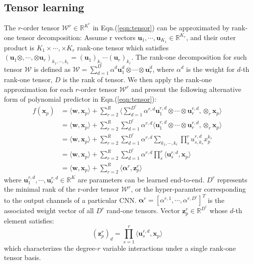 \documentclass[a4paper,4pt]{article}
\begin{document}
\subsection{Tensor learning}
The $r$-order tensor $\bm{\mathcal{W}}^r \in \mathbb{R}^{K^r}$ in Eqn.(\ref{eqn:tensor})
can be approximated by rank-one tensor decomposition: Assume r vectors
$\bm{u}_1,\cdots,\bm{u}_{K_1} \in \mathbb{R}^{K_r}$, and their outer product
is $K_1\times \cdots,\times K_r$ rank-one tensor which satisfies
$(\bm{u}_1 \otimes,\cdots,\otimes \bm{u}_r )_{k_1,\cdots,k_r} 
= (\bm{u}_1)_{k_1}\cdots(\bm{u}_r)_{k_r}$. 
The rank-one decomposition for such tensor $\bm{\mathcal{W}}$ is defined as 
$\bm{\mathcal{W}}=\sum_{d=1}^D \alpha^d \bm{u}_1^d\otimes \cdots \otimes \bm{u}_r^d $,
where $\alpha^d$ is the weight for $d$-th rank-one tensor, $D$ is the rank of tensor.
We then apply the rank-one approximation for each $r$-order tensor $\bm{\mathcal{W}}^r$
and present the following alternative form of polynomial predictor in Eqn.(\ref{eqn:tensor}):
\begin{equation}\label{eqn:confused}
    \begin{aligned}
        f(\bm{x}_p)
        &=\langle \bm{w}, \bm{x}_p \rangle
        +\sum^{R}_{r=2}\langle \sum^{D^r}_{d=1} \alpha^{r,d} 
        \bm{u}_1^{r,d}\otimes \cdots \otimes \bm{u}_r^{r,d}, \otimes_r \bm{x}_p \rangle
        \\
        &=\langle \bm{w}, \bm{x}_p \rangle
        +\sum^{R}_{r=2} \sum^{D^r}_{d=1} \alpha^{r,d} 
        \langle\bm{u}_1^{r,d}\otimes \cdots \otimes \bm{u}_r^{r,d}, \otimes_r \bm{x}_p \rangle
        \\
        &=\langle \bm{w}, \bm{x}_p \rangle
        +\sum^{R}_{r=2} \sum^{D^r}_{d=1} \alpha^{r,d} 
        \sum_{k_1,\cdots,k_r}\prod_s^r u^{r,d}_{s,k_s} x_p^{k_s}
        \\
        &=\langle \bm{w}, \bm{x}_p \rangle
        +\sum^{R}_{r=2} \sum^{D^r}_{d=1} \alpha^{r,d}
        \prod_s^r \langle \bm{u}_s^{r,d}, \bm{x}_p\rangle
        \\
        &=\langle \bm{w}, \bm{x}_p \rangle
        +\sum^{R}_{r=2} \langle \bm{\alpha}^r, \bm{z}^r_p \rangle
    \end{aligned}
\end{equation}
where $\bm{u}_1^{r,d}, \cdots, \bm{u}_r^{r,d} \in \mathbb{R}^{K}$ are parameters
can be learned end-to-end. $D^r$ represents the minimal rank of the r-order tensor
$\bm{\mathcal{W}}^r$, or the hyper-paramter corresponding to the output
channels of a particular CNN.
$\bm{\alpha}^r=[\alpha^{r,1},\cdots,\alpha^{r,D^r}]^T$ is 
the associated weight vector of all $D^r$ rand-one tensors. 
Vector $\bm{z}^r_p \in \mathbb{R}^{D^r}$ whose $d$-th element satisfies:
\begin{equation}\label{eqn:d_th}
    (\bm{z}^r_p)_d=\prod_{s=1}^r \langle \bm{u}_s^{r,d},\bm{x}_p\rangle  
\end{equation}
which characterizes the degree-$r$ variable interactions under a single rank-one tensor basis.
\end{document}
